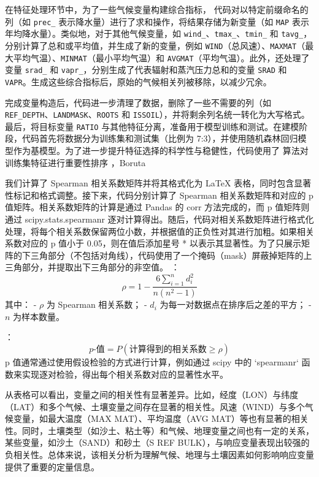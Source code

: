 \documentclass[AutoFakeBold]{LZUThesis-PgD&PhD}
\begin{document}
	在特征处理环节中，为了一些气候变量构建综合指标，
	代码对以特定前缀命名的列（如 \texttt{prec\_} 表示降水量）进行了求和操作，将结果存储为新变量（如 \texttt{MAP} 表示年均降水量）。类似地，对于其他气候变量，如 \texttt{wind\_}、\texttt{tmax\_}、\texttt{tmin\_} 和 \texttt{tavg\_}，分别计算了总和或平均值，并生成了新的变量，例如 \texttt{WIND}（总风速）、\texttt{MAXMAT}（最大平均气温）、\texttt{MINMAT}（最小平均气温）和 \texttt{AVGMAT}（平均气温）。此外，还处理了变量 \texttt{srad\_} 和 \texttt{vapr\_}，分别生成了代表辐射和蒸汽压力总和的变量 \texttt{SRAD} 和 \texttt{VAPR}。生成这些综合指标后，原始的气候相关列被移除，以减少冗余。
	
	完成变量构造后，代码进一步清理了数据，删除了一些不需要的列（如 \texttt{REF\_DEPTH}、\texttt{LANDMASK}、\texttt{ROOTS} 和 \texttt{ISSOIL}），并将剩余列名统一转化为大写格式。最后，将目标变量 \texttt{RATIO} 与其他特征分离，准备用于模型训练和测试。在建模阶段，代码首先将数据分为训练集和测试集（比例为 7:3），并使用随机森林回归模型作为基模型。为了进一步提升特征选择的科学性与稳健性，代码使用了 \texttt{} 算法对训练集特征进行重要性排序 \cite{kursa2010feature}，Boruta
	
	
	我们计算了 Spearman 相关系数矩阵并将其格式化为 LaTeX 表格，同时包含显著性标记和格式调整。接下来，代码分别计算了 Spearman 相关系数矩阵和对应的 p 值矩阵。相关系数矩阵的计算是通过 Pandas 的 corr 方法完成的，而 p 值矩阵则通过 scipy.stats.spearmanr 逐对计算得出。随后，代码对相关系数矩阵进行格式化处理，将每个相关系数保留两位小数，并根据值的正负性对其进行加粗。如果相关系数对应的 p 值小于 0.05，则在值后添加星号 * 以表示其显著性。为了只展示矩阵的下三角部分（不包括对角线），代码使用了一个掩码（mask）屏蔽掉矩阵的上三角部分，并提取出下三角部分的非空值。
	：
	\[
	\rho = 1 - \frac{6 \sum_{i=1}^{n} d_i^2}{n(n^2 - 1)}
	\]
	其中：
	- \( \rho \) 为 Spearman 相关系数；
	- \( d_i \) 为每一对数据点在排序后之差的平方；
	- \( n \) 为样本数量。
	
	：
	\[
	p\text{-值} = P(\text{计算得到的相关系数} \geq \rho)
	\]
	p 值通常通过使用假设检验的方式进行计算，例如通过 scipy 中的 `spearmanr` 函数来实现逐对检验，得出每个相关系数对应的显著性水平。
	
	从表格可以看出，变量之间的相关性有显著差异。比如，经度（LON）与纬度（LAT）和多个气候、土壤变量之间存在显著的相关性。风速（WIND）与多个气候变量，如最大温度（MAX MAT）、平均温度（AVG MAT）等也有显著的相关性。同时，土壤类型（如沙土、粘土等）和气候、地理变量之间也有一定的关系，某些变量，如沙土（SAND）和砂土（S REF BULK），与响应变量表现出较强的负相关性。总体来说，该相关分析为理解气候、地理与土壤因素如何影响响应变量提供了重要的定量信息。
	
\end{document}
